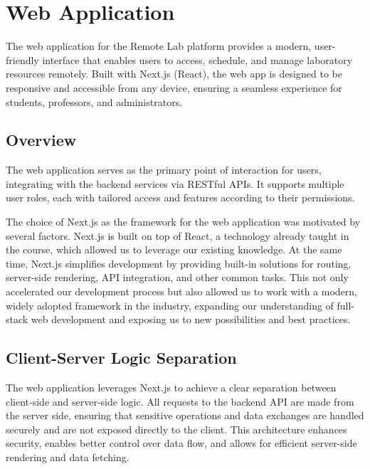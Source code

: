 \section{Web Application}

The web application for the Remote Lab platform provides a modern, user-friendly interface that enables users to access, schedule, and manage laboratory resources remotely. Built with Next.js (React), the web app is designed to be responsive and accessible from any device, ensuring a seamless experience for students, professors, and administrators.

\subsection{Overview}
The web application serves as the primary point of interaction for users, integrating with the backend services via RESTful APIs. It supports multiple user roles, each with tailored access and features according to their permissions.

The choice of Next.js as the framework for the web application was motivated by several factors. Next.js is built on top of React, a technology already taught in the course, which allowed us to leverage our existing knowledge. At the same time, Next.js simplifies development by providing built-in solutions for routing, server-side rendering, API integration, and other common tasks. This not only accelerated our development process but also allowed us to work with a modern, widely adopted framework in the industry, expanding our understanding of full-stack web development and exposing us to new possibilities and best practices.

\subsection{Client-Server Logic Separation}

The web application leverages Next.js to achieve a clear separation between client-side and server-side logic. All requests to the backend API are made from the server side, ensuring that sensitive operations and data exchanges are handled securely and are not exposed directly to the client. This architecture enhances security, enables better control over data flow, and allows for efficient server-side rendering and data fetching.

